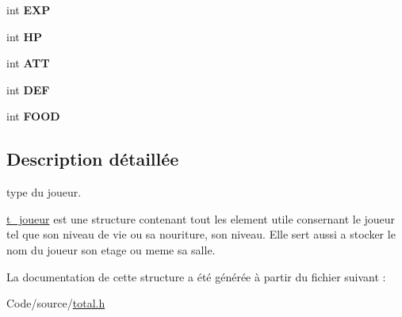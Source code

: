 \begin{DoxyCompactItemize}
\item 
\hypertarget{structt__joueur_ad1e277dbbb6e308a4ed6047b051cd184}{int {\bfseries E\-X\-P}}\label{structt__joueur_ad1e277dbbb6e308a4ed6047b051cd184}

\item 
\hypertarget{structt__joueur_a152d91e6a9d741b2914f06997c0044f9}{int {\bfseries H\-P}}\label{structt__joueur_a152d91e6a9d741b2914f06997c0044f9}

\item 
\hypertarget{structt__joueur_ac4f5b3473792a52bac1d64a3f4f2b7e9}{int {\bfseries A\-T\-T}}\label{structt__joueur_ac4f5b3473792a52bac1d64a3f4f2b7e9}

\item 
\hypertarget{structt__joueur_a14432729537b37583c49fb38896d8f99}{int {\bfseries D\-E\-F}}\label{structt__joueur_a14432729537b37583c49fb38896d8f99}

\item 
\hypertarget{structt__joueur_ac2643fd79fbfc94efaa7ae6d989b3ca3}{int {\bfseries F\-O\-O\-D}}\label{structt__joueur_ac2643fd79fbfc94efaa7ae6d989b3ca3}

\end{DoxyCompactItemize}


\subsection{Description détaillée}
type du joueur. 

\hyperlink{structt__joueur}{t\-\_\-joueur} est une structure contenant tout les element utile consernant le joueur tel que son niveau de vie ou sa nouriture, son niveau. Elle sert aussi a stocker le nom du joueur son etage ou meme sa salle. 

La documentation de cette structure a été générée à partir du fichier suivant \-:\begin{DoxyCompactItemize}
\item 
Code/source/\hyperlink{total_8h}{total.\-h}\end{DoxyCompactItemize}
